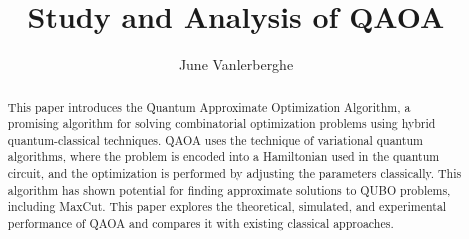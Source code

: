 \documentclass{article}
\title{Study and Analysis of QAOA}
\author{June Vanlerberghe}
\begin{document}
\maketitle
\begin{abstract}
This paper introduces the Quantum Approximate Optimization Algorithm, a promising algorithm for solving combinatorial optimization problems using hybrid quantum-classical techniques. QAOA uses the technique of variational quantum algorithms, where the problem is encoded into a Hamiltonian used in the quantum circuit, and the optimization is performed by adjusting the parameters classically. This algorithm has shown potential for finding approximate solutions to QUBO problems, including MaxCut. This paper explores the theoretical, simulated, and experimental performance of QAOA and compares it with existing classical approaches. 
\end{abstract}

\begin{multicols*}{2}






\end{multicols*}



\end{document}
